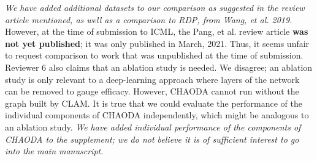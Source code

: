 \documentclass{article}
\begin{document}
\emph{We have added additional datasets to our comparison as suggested in the review article mentioned, as well as a comparison to RDP, from Wang, et al. 2019}.
However, at the time of submission to ICML, the Pang, et al. review article \textbf{was not yet published}; it was only published in March, 2021.
Thus, it seems unfair to request comparison to work that was unpublished at the time of submission.
Reviewer 6 also claims that an ablation study is needed.
We disagree; an ablation study is only relevant to a deep-learning approach where layers of the network can be removed to gauge efficacy.
However, CHAODA cannot run without the graph built by CLAM.
It is true that we could evaluate the performance of the individual components of CHAODA independently, which might be analogous to an ablation study.
\emph{We have added individual performance of the components of CHAODA to the supplement; we do not believe it is of sufficient interest to go into the main manuscript}.
\end{document}
